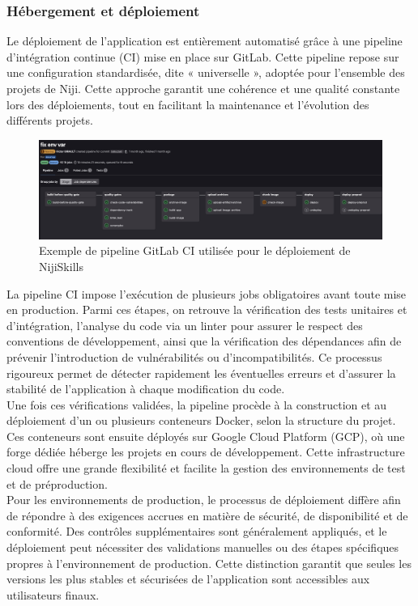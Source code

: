 \documentclass[12pt]{article}
\begin{document}
\subsubsection{Hébergement et déploiement}
Le déploiement de l’application est entièrement automatisé grâce à une pipeline d’intégration continue (CI) mise en place sur GitLab. Cette pipeline repose sur une configuration standardisée, dite « universelle », adoptée pour l’ensemble des projets de Niji. Cette approche garantit une cohérence et une qualité constante lors des déploiements, tout en facilitant la maintenance et l’évolution des différents projets.
\\
\begin{figure}[H]
  \centering
  \includegraphics[width=\textwidth]{img/gitlab-ci-pipeline.png}
  \caption{Exemple de pipeline GitLab CI utilisée pour le déploiement de NijiSkills}
\end{figure}
\noindent
La pipeline CI impose l’exécution de plusieurs jobs obligatoires avant toute mise en production. Parmi ces étapes, on retrouve la vérification des tests unitaires et d’intégration, l’analyse du code via un linter pour assurer le respect des conventions de développement, ainsi que la vérification des dépendances afin de prévenir l’introduction de vulnérabilités ou d’incompatibilités. Ce processus rigoureux permet de détecter rapidement les éventuelles erreurs et d’assurer la stabilité de l’application à chaque modification du code.
\\
Une fois ces vérifications validées, la pipeline procède à la construction et au déploiement d’un ou plusieurs conteneurs Docker, selon la structure du projet. Ces conteneurs sont ensuite déployés sur Google Cloud Platform (GCP), où une forge dédiée héberge les projets en cours de développement. Cette infrastructure cloud offre une grande flexibilité et facilite la gestion des environnements de test et de préproduction.
\\
Pour les environnements de production, le processus de déploiement diffère afin de répondre à des exigences accrues en matière de sécurité, de disponibilité et de conformité. Des contrôles supplémentaires sont généralement appliqués, et le déploiement peut nécessiter des validations manuelles ou des étapes spécifiques propres à l’environnement de production. Cette distinction garantit que seules les versions les plus stables et sécurisées de l’application sont accessibles aux utilisateurs finaux.
\end{document}
